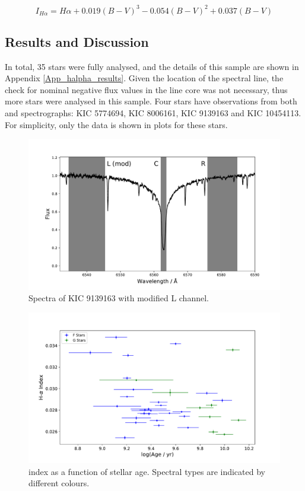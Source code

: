\begin{equation}
    I_{H\alpha} = H\alpha + 0.019(B-V)^{3} - 0.054(B-V)^{2} + 0.037(B-V)
    \label{Eq:I_H_alpha}
\end{equation}

\subsection{Results and Discussion}
In total, 35 stars were fully analysed, and the details of this sample are shown in Appendix \ref{App_halpha_results}. Given the location of the \Halpha spectral line, the check for nominal negative flux values in the line core was not necessary, thus more stars were analysed in this sample. Four stars have observations from both \esp and \narval spectrographs: KIC 5774694, KIC 8006161, KIC 9139163 and KIC 10454113. For simplicity, only the \narval data is shown in plots for these stars.

\begin{figure}
    \centering
    \includegraphics[scale=0.55]{Figures/4-Chromospheric_age/halpha_modified_channels.pdf}
    \caption[Spectra of KIC 9139163 with modified \Halpha channels]{Spectra of KIC 9139163 with modified \Halpha L channel.}
    \label{fig:modified_halpha_channels}
\end{figure}

\begin{figure}
    \centering
    \includegraphics[scale=0.55]{Figures/4-Chromospheric_age/all_data_Halpha_index.pdf}
    \caption[\Halpha index as a function of stellar age]{\Halpha index as a function of stellar age. Spectral types are indicated by different colours.}
    \label{fig:mod_halpha_index_v_age}
\end{figure}

